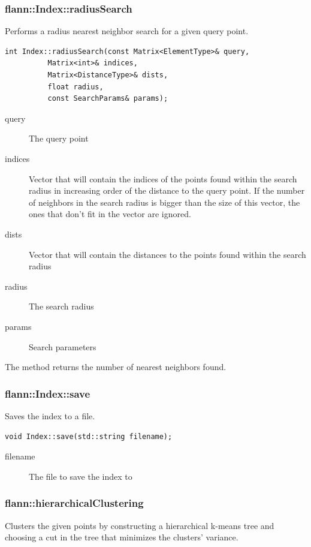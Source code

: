 \documentclass[letter,10pt]{article}
\begin{document}
\subsubsection{flann::Index::radiusSearch}
Performs a radius nearest neighbor search for a given query point.
\begin{Verbatim}[fontsize=\footnotesize,frame=single]
int Index::radiusSearch(const Matrix<ElementType>& query,
		  Matrix<int>& indices,
		  Matrix<DistanceType>& dists,
		  float radius,
		  const SearchParams& params); 
\end{Verbatim}

\begin{description}
\item[query]{The query point}
\item[indices]{Vector that will contain the indices of the points found within the search radius in increasing order of the distance to the query point. If the number of neighbors in the search radius is bigger than the size of this vector, the ones that don't fit in the vector are ignored. }
\item[dists]{Vector that will contain the distances to the points found within the search radius}
\item[radius]{The search radius}
\item[params]{Search parameters}
\end{description}
The method returns the number of nearest neighbors found.


\subsubsection{flann::Index::save}
Saves the index to a file.
\begin{Verbatim}[fontsize=\footnotesize,frame=single]
  void Index::save(std::string filename);
\end{Verbatim}
\begin{description}
\item[filename]{The file to save the index to}
\end{description}

\subsubsection{flann::hierarchicalClustering}
\label{flann::hierarchicalClustering}
Clusters the given points by constructing a hierarchical k-means tree and choosing a cut in the tree that minimizes the clusters' variance.
\end{document}
